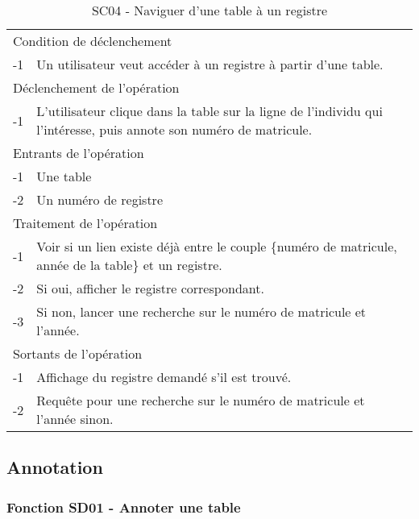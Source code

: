 \documentclass[a4paper]{article}
\begin{document}
\begin{table}[H]
  \centering
   \small
	\begin{tabular}{|c|p{12cm}|}
   		\hline
   			\rowcolor{lightgray}\multicolumn{2}{|c|}{\textbf{SC04 - Naviguer d'une table à un registre}} \\
   		\hline
   			\multicolumn{2}{|l|}{Condition de d\'eclenchement} \\
   		\hline
   		-1 & Un utilisateur veut acc\'eder \`a un registre à partir d'une table. \\
   		\hline
   			\multicolumn{2}{|l|}{D\'eclenchement de l'op\'eration} \\
   		\hline
   			-1 & L'utilisateur clique dans la table sur la ligne de l'individu qui l'intéresse, puis annote son numéro de matricule. \\
   		\hline
   			\multicolumn{2}{|l|}{Entrants de l'op\'eration} \\
   		\hline
   			-1 & Une table \\
        	-2 & Un numéro de registre \\ 
   		\hline
   			\multicolumn{2}{|l|}{Traitement de l'op\'eration} \\
  		\hline
   			-1 & Voir si un lien existe déjà entre le couple \{numéro de matricule, année de la table\} et un registre.  \\
        	-2 & Si oui, afficher le registre correspondant. \\
        	-3 & Si non, lancer une recherche sur le numéro de matricule et l'année. \\
   		\hline
   			\multicolumn{2}{|l|}{Sortants de l'op\'eration} \\
   		\hline
   			-1 & Affichage du registre demand\'e s'il est trouvé. \\
            -2 & Requête pour une recherche sur le numéro de matricule et l'année sinon. \\
   		\hline
	\end{tabular}
  \caption{SC04 - Naviguer d'une table à un registre}
  \normalsize
  \label{tab:naviguer_table_registre}
\end{table}
\newpage

\subsection{Annotation}



\subsubsection{Fonction SD01 - Annoter une table}
\end{document}

